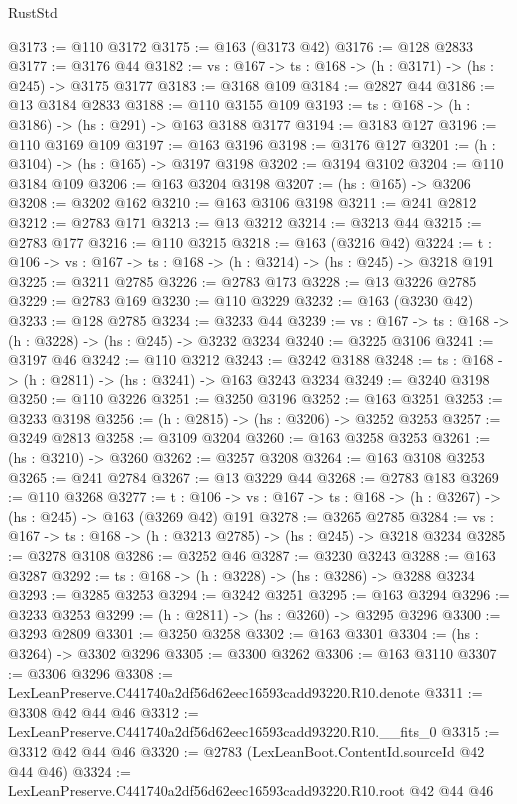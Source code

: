 \begin{lexlean}{RustStd}
\begin{coremodule}
@3173 := @110 @3172
@3175 := @163 (@3173 @42)
@3176 := @128 @2833
@3177 := @3176 @44
@3182 := {vs : @167} -> {ts : @168} -> (h : @3171) -> (hs : @245) -> @3175 @3177
@3183 := @3168 @109
@3184 := @2827 @44
@3186 := @13 @3184 @2833
@3188 := @110 @3155 @109
@3193 := {ts : @168} -> (h : @3186) -> (hs : @291) -> @163 @3188 @3177
@3194 := @3183 @127
@3196 := @110 @3169 @109
@3197 := @163 @3196
@3198 := @3176 @127
@3201 := (h : @3104) -> (hs : @165) -> @3197 @3198
@3202 := @3194 @3102
@3204 := @110 @3184 @109
@3206 := @163 @3204 @3198
@3207 := (hs : @165) -> @3206
@3208 := @3202 @162
@3210 := @163 @3106 @3198
@3211 := @241 @2812
@3212 := @2783 @171
@3213 := @13 @3212
@3214 := @3213 @44
@3215 := @2783 @177
@3216 := @110 @3215
@3218 := @163 (@3216 @42)
@3224 := {t : @106} -> {vs : @167} -> {ts : @168} -> (h : @3214) -> (hs : @245) -> @3218 @191
@3225 := @3211 @2785
@3226 := @2783 @173
@3228 := @13 @3226 @2785
@3229 := @2783 @169
@3230 := @110 @3229
@3232 := @163 (@3230 @42)
@3233 := @128 @2785
@3234 := @3233 @44
@3239 := {vs : @167} -> {ts : @168} -> (h : @3228) -> (hs : @245) -> @3232 @3234
@3240 := @3225 @3106
@3241 := @3197 @46
@3242 := @110 @3212
@3243 := @3242 @3188
@3248 := {ts : @168} -> (h : @2811) -> (hs : @3241) -> @163 @3243 @3234
@3249 := @3240 @3198
@3250 := @110 @3226
@3251 := @3250 @3196
@3252 := @163 @3251
@3253 := @3233 @3198
@3256 := (h : @2815) -> (hs : @3206) -> @3252 @3253
@3257 := @3249 @2813
@3258 := @3109 @3204
@3260 := @163 @3258 @3253
@3261 := (hs : @3210) -> @3260
@3262 := @3257 @3208
@3264 := @163 @3108 @3253
@3265 := @241 @2784
@3267 := @13 @3229 @44
@3268 := @2783 @183
@3269 := @110 @3268
@3277 := {t : @106} ->
  {vs : @167} -> {ts : @168} -> (h : @3267) -> (hs : @245) -> @163 (@3269 @42) @191
@3278 := @3265 @2785
@3284 := {vs : @167} -> {ts : @168} -> (h : @3213 @2785) -> (hs : @245) -> @3218 @3234
@3285 := @3278 @3108
@3286 := @3252 @46
@3287 := @3230 @3243
@3288 := @163 @3287
@3292 := {ts : @168} -> (h : @3228) -> (hs : @3286) -> @3288 @3234
@3293 := @3285 @3253
@3294 := @3242 @3251
@3295 := @163 @3294
@3296 := @3233 @3253
@3299 := (h : @2811) -> (hs : @3260) -> @3295 @3296
@3300 := @3293 @2809
@3301 := @3250 @3258
@3302 := @163 @3301
@3304 := (hs : @3264) -> @3302 @3296
@3305 := @3300 @3262
@3306 := @163 @3110
@3307 := @3306 @3296
@3308 := LexLeanPreserve.C441740a2df56d62eec16593cadd93220.R10.denote
@3311 := @3308 @42 @44 @46
@3312 := LexLeanPreserve.C441740a2df56d62eec16593cadd93220.R10.__fits_0
@3315 := @3312 @42 @44 @46
@3320 := @2783 (LexLeanBoot.ContentId.sourceId @42 @44 @46)
@3324 := LexLeanPreserve.C441740a2df56d62eec16593cadd93220.R10.root @42 @44 @46

\end{coremodule}
\end{lexlean}
